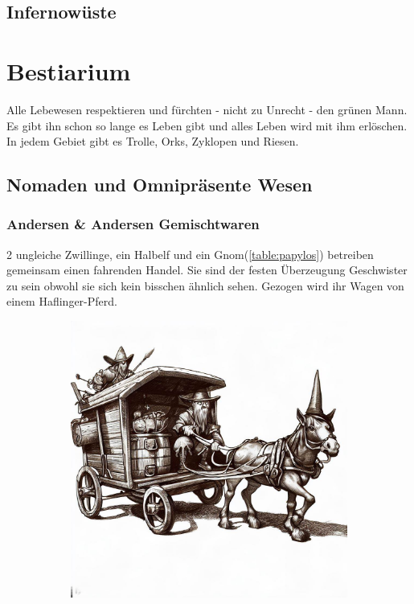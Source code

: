 \documentclass[11pt, twoside]{article}
\begin{document}
\subsection{Infernowüste}
\label{sec:orgdd4912a}

\newpage

\section{Bestiarium}
\label{sec:org8185b88}
Alle Lebewesen respektieren und fürchten - nicht zu Unrecht - den grünen Mann. Es gibt ihn schon so lange es Leben gibt und alles Leben wird mit ihm erlöschen.
In jedem Gebiet gibt es Trolle, Orks, Zyklopen und Riesen.

\clearpage

\subsection{Nomaden und Omnipräsente Wesen}
\label{sec:orgf59e904}
\subsubsection{Andersen \& Andersen Gemischtwaren\label{andersen}}
\label{sec:org9fb4f09}
2 ungleiche Zwillinge, ein Halbelf und ein Gnom(\ref{table:papylos}) betreiben gemeinsam einen fahrenden Handel. Sie sind der festen Überzeugung Geschwister zu sein obwohl sie sich kein bisschen ähnlich sehen. Gezogen wird ihr Wagen von einem Haflinger-Pferd.
\begin{figure}[H]
\centering
\caption{Die Händler Papylos und Popylos Andersen}
\label{fig:andersens}
  \begin{subfigure}{0.5\textwidth}
    \centering
    \includegraphics[width=0.99\linewidth]{andersens.jpeg}
  \end{subfigure}
\end{figure}
\end{document}
